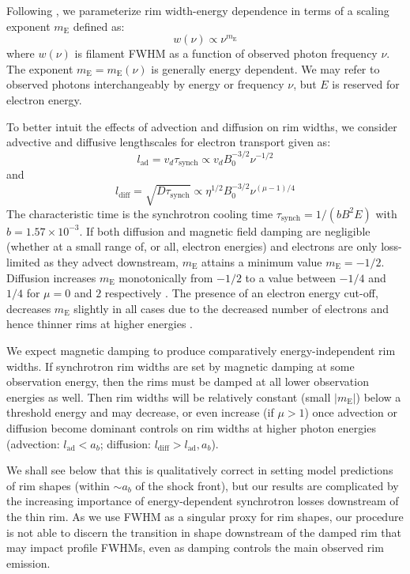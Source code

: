 \documentclass[iop, apj, numberedappendix]{emulateapj}
\newcommand*{\mt}{\mathrm}
\newcommand*{\abt}{\mathord{\sim}} %
\newcommand*{\tsynch}{\tau_{\mt{synch}}}
\newcommand*{\mE}{m_\mt{E}}
\begin{document}
Following , we parameterize rim width-energy dependence
in terms of a scaling exponent $\mE$ defined as:
\begin{equation}
    w(\nu) \propto \nu^{\mE}
\end{equation}
where $w(\nu)$ is filament FWHM as a function of observed photon frequency
$\nu$.  The exponent $\mE = \mE(\nu)$ is generally energy dependent.  We may
refer to observed photons interchangeably by energy or frequency $\nu$, but $E$
is reserved for electron energy.

To better intuit the effects of advection and diffusion on rim widths, we
consider advective and diffusive lengthscales for electron transport given as:
\begin{equation} \label{eq:lad}
    l_{\mt{ad}} = v_d \tsynch \propto v_d B_0^{-3/2} \nu^{-1/2}
\end{equation}
and
\begin{equation} \label{eq:ldiff}
    l_{\mt{diff}} = \sqrt{D \tsynch} \propto \eta^{1/2} B_0^{-3/2} \nu^{(\mu-1)/4}
\end{equation}
The characteristic time is the synchrotron cooling time
$\tsynch = 1 / (b B^2 E)$ with $b = 1.57 \times 10^{-3}$.
If both diffusion and magnetic field damping are negligible (whether at a small
range of, or all, electron energies) and electrons are only loss-limited as
they advect downstream, $\mE$ attains a minimum value $\mE = -1/2$.  Diffusion
increases $\mE$ monotonically from $-1/2$ to a value between $-1/4$ and $1/4$
for $\mu = 0$ and $2$ respectively .  The
presence of an electron energy cut-off, decreases $\mE$ slightly in all cases
due to the decreased number of electrons and hence thinner rims at higher
energies .

We expect magnetic damping to produce comparatively energy-independent rim
widths.  If synchrotron rim widths are set by magnetic damping
at some observation energy, then the rims must be damped at all lower
observation energies as well.  Then rim widths will be relatively constant
(small $|\mE|$) below a threshold energy and may decrease, or even increase
(if $\mu > 1$) once advection or diffusion become dominant controls on rim
widths at higher photon energies (advection: $l_\mt{ad} < a_b$;
diffusion: $l_{\mt{diff}} > l_{\mt{ad}}, a_b$).

We shall see below that this is qualitatively correct in setting model
predictions of rim shapes (within $\abt a_b$ of the shock front), but our
results are complicated by the increasing importance of energy-dependent
synchrotron losses downstream of the thin rim.  As we use FWHM as a singular
proxy for rim shapes, our procedure is not able to discern the transition in
shape downstream of the damped rim that may impact profile FWHMs, even as
damping controls the main observed rim emission.
\end{document}
